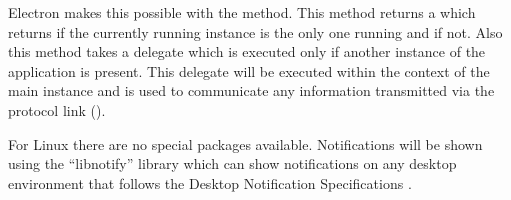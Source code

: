 Electron makes this possible with the  method. This method returns a  which returns  if the currently running instance is the only one running and  if not. Also this method takes a delegate which is executed only if another instance of the application is present. This delegate will be executed within the context of the main instance and is used to communicate any information transmitted via the protocol link ().





For Linux there are no special packages available. Notifications will be shown using the \enquote{libnotify} library which can show notifications on any desktop environment that follows the Desktop Notification Specifications \cite{desktopNotificationSpec} \cite{electronNotifications}.
